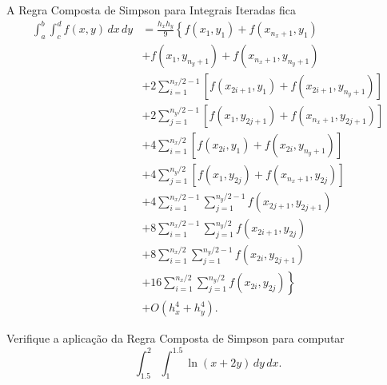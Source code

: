 A Regra Composta de Simpson para Integrais Iteradas fica
\begin{align}
  \int_a^b\int_c^d f(x,y)\,dx\,dy &= \frac{h_xh_y}{9}\left\{f(x_1,y_1) + f(x_{n_x+1},y_1)\right.\nonumber\\
                                  &+ f(x_1,y_{n_y+1}) + f(x_{n_x+1},y_{n_y+1})\nonumber\\
                                  &+ 2\sum_{i=1}^{n_x/2-1} \left[f(x_{2i+1},y_{1}) + f(x_{2i+1},y_{n_y+1})\right]\nonumber\\
                                  &+ 2\sum_{j=1}^{n_y/2-1} \left[f(x_{1},y_{2j+1}) + f(x_{n_x+1},y_{2j+1})\right]\nonumber\\
                                  &+ 4\sum_{i=1}^{n_x/2} \left[f(x_{2i},y_{1}) + f(x_{2i},y_{n_y+1})\right]\nonumber\\
                                  &+ 4\sum_{j=1}^{n_y/2} \left[f(x_{1},y_{2j}) + f(x_{n_x+1},y_{2j})\right]\nonumber\\
                                  &+ 4\sum_{i=1}^{n_x/2-1}\sum_{j=1}^{n_y/2-1}f(x_{2j+1},y_{2j+1})\nonumber\\
                                  &+ 8\sum_{i=1}^{n_x/2-1}\sum_{j=1}^{n_y/2}f(x_{2i+1},y_{2j})\nonumber\\
                                  &+ 8\sum_{i=1}^{n_x/2}\sum_{j=1}^{n_y/2-1}f(x_{2i},y_{2j+1})\nonumber\\
                                  &\left.+ 16\sum_{i=1}^{n_x/2}\sum_{j=1}^{n_y/2}f(x_{2i},y_{2j})\right\}\nonumber\\
                                  &+ O(h_x^4 + h_y^4).
\end{align}


\begin{exer}
  Verifique a aplicação da Regra Composta de Simpson para computar
  \begin{equation}
    \int_{1.5}^{2}\int_{1}^{1.5}\ln(x + 2y)\,dy\,dx.
  \end{equation}
\end{exer}
